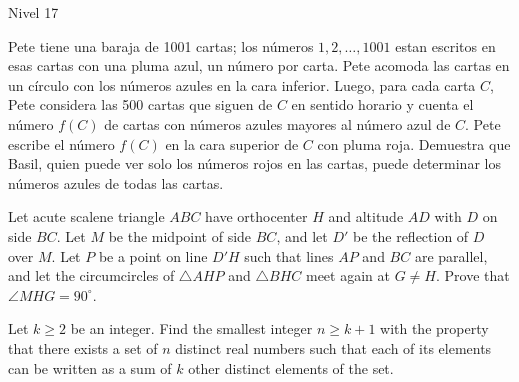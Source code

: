 \documentclass[12pt]{article}
\begin{document}
\begin{examen}{Nivel 17}{}

\begin{problema}
Pete tiene una baraja de 1001 cartas; los n\'umeros $1,2,\ldots, 1001$ estan escritos en esas cartas con una pluma azul, un n\'umero por carta. Pete acomoda las cartas en un c\'irculo con los n\'umeros azules en la cara inferior. Luego, para cada carta $C$, Pete considera las 500 cartas que siguen de $C$ en sentido horario y cuenta el n\'umero $f(C)$ de cartas con n\'umeros azules mayores al n\'umero azul de $C$. Pete escribe el n\'umero $f(C)$ en la cara superior de $C$ con pluma roja. Demuestra que Basil, quien puede ver solo los n\'umeros rojos en las cartas, puede determinar los n\'umeros azules de todas las cartas.
\end{problema}

\begin{problema}
Let acute scalene triangle $ABC$ have orthocenter $H$ and altitude $AD$ with $D$ on side $BC$. Let $M$ be the midpoint of side $BC$, and let $D'$ be the reflection of $D$ over $M$. Let $P$ be a point on line $D'H$ such that lines $AP$ and $BC$ are parallel, and let the circumcircles of $\triangle AHP$ and $\triangle BHC$ meet again at $G \neq H$. Prove that $\angle MHG = 90^\circ$.
\end{problema}


\begin{problema}
Let $k\ge2$ be an integer. Find the smallest integer $n \ge k+1$ with the property that there exists a set of $n$ distinct real numbers such that each of its elements can be written as a sum of $k$ other distinct elements of the set.
\end{problema}


\end{examen}
\end{document}
